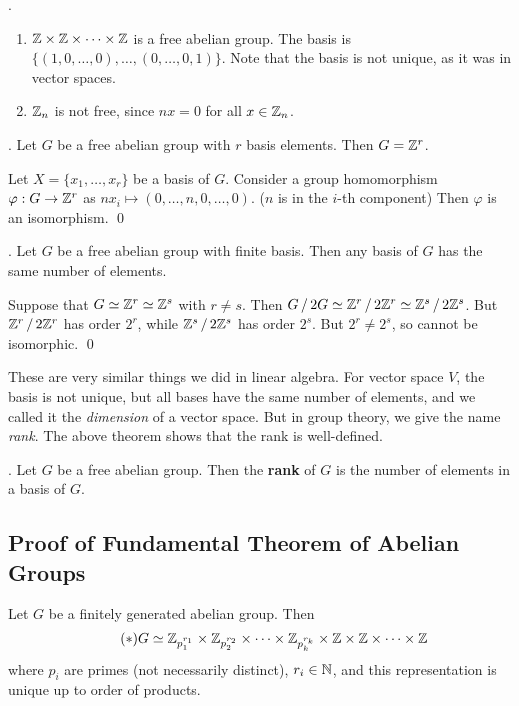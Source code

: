 \ex.
\begin{enumerate}
    \item \(\mathbb{Z} \times \mathbb{Z} \times \cdots \times \mathbb{Z}\) is a free abelian group. The basis is \(\{(1, 0, \dots, 0), \dots, (0, \dots, 0, 1)\}\). Note that the basis is not unique, as it was in vector spaces.
    \item \(\mathbb{Z}_n\) is not free, since \(nx = 0\) for all \(x \in \mathbb{Z}_n\).
\end{enumerate}

\thm. Let \(G\) be a free abelian group with \(r\) basis elements. Then \(G = \mathbb{Z}^r\).

\pf Let \(X = \{x_1, \dots, x_r\}\) be a basis of \(G\). Consider a group homomorphism \(\varphi : G \rightarrow \mathbb{Z}^r\) as \(nx_i \mapsto (0, \dots, n, 0, \dots, 0)\). (\(n\) is in the \(i\)-th component) Then \(\varphi\) is an isomorphism. \qed

\pagebreak

\thm. Let \(G\) be a free abelian group with finite basis. Then any basis of \(G\) has the same number of elements.

\pf Suppose that \(G \simeq \mathbb{Z}^r \simeq \mathbb{Z}^s\) with \(r\neq s\). Then \(G \operatorname{/} 2G \simeq \mathbb{Z}^r \operatorname{/} 2\mathbb{Z}^r \simeq \mathbb{Z}^s \operatorname{/} 2\mathbb{Z}^s\). But \(\mathbb{Z}^r \operatorname{/} 2\mathbb{Z}^r\) has order \(2^r\), while \(\mathbb{Z}^s \operatorname{/} 2\mathbb{Z}^s\) has order \(2^s\). But \(2^r \neq 2^s\), so cannot be isomorphic. \qed

These are very similar things we did in linear algebra. For vector space \(V\), the basis is not unique, but all bases have the same number of elements, and we called it the \textit{dimension} of a vector space. But in group theory, we give the name \textit{rank}. The above theorem shows that the rank is well-defined.

.  Let \(G\) be a free abelian group. Then the \textbf{rank} of \(G\) is the number of elements in a basis of \(G\).

\subsection*{Proof of Fundamental Theorem of Abelian Groups}

\recall Let \(G\) be a finitely generated abelian group. Then
\[ \tag{\mast}
    G \simeq \Z_{p_1^{r_1}} \times \Z_{p_2^{r_2}} \times \cdots \times \Z_{p_k^{r_k}} \times \Z \times \Z \times \cdots \times \Z
\]
where \(p_i\) are primes (not necessarily distinct), \(r_i \in \mathbb{N}\), and this representation is unique up to order of products.

